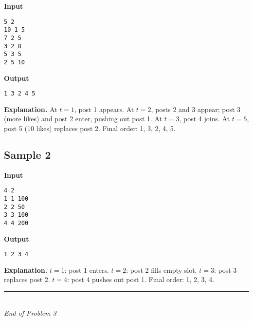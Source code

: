 \documentclass[12pt,a4paper]{article}
\begin{document}
\noindent
\begin{minipage}[t]{0.49\textwidth}
\textbf{Input}
\begin{lstlisting}
5 2
10 1 5
7 2 5
3 2 8
5 3 5
2 5 10
\end{lstlisting}
\end{minipage}\hfill
\begin{minipage}[t]{0.49\textwidth}
\textbf{Output}
\begin{lstlisting}
1 3 2 4 5
\end{lstlisting}
\end{minipage}

\smallskip
\noindent\textbf{Explanation.}
At $t=1$, post 1 appears. At $t=2$, posts 2 and 3 appear; post 3 (more likes) and post 2 enter, pushing out post 1. At $t=3$, post 4 joins. At $t=5$, post 5 (10 likes) replaces post 2. Final order: 1, 3, 2, 4, 5.

\subsection*{Sample 2}

\noindent
\begin{minipage}[t]{0.49\textwidth}
\textbf{Input}
\begin{lstlisting}
4 2
1 1 100
2 2 50
3 3 100
4 4 200
\end{lstlisting}
\end{minipage}\hfill
\begin{minipage}[t]{0.49\textwidth}
\textbf{Output}
\begin{lstlisting}
1 2 3 4
\end{lstlisting}
\end{minipage}

\smallskip
\noindent\textbf{Explanation.}
$t=1$: post 1 enters. $t=2$: post 2 fills empty slot. $t=3$: post 3 replaces post 2. $t=4$: post 4 pushes out post 1. Final order: 1, 2, 3, 4.

\vfill
\begin{center}
    \rule{0.8\textwidth}{0.4pt} \\[0.3em]
    \textit{End of Problem 3}
\end{center}
\end{document}
